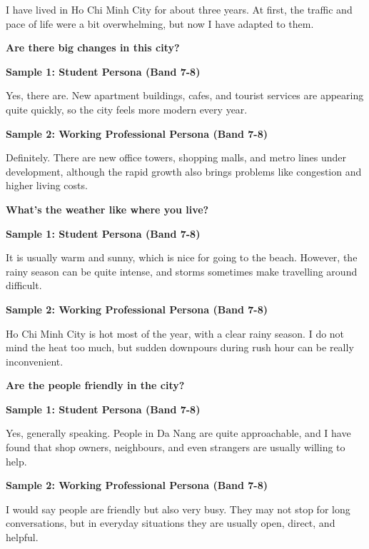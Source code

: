I have lived in Ho Chi Minh City for about three years. At first, the traffic and pace of life were a bit overwhelming, but now I have adapted to them.

\separator

\begin{ieltsquestion}
\textbf{Are there big changes in this city?}
\end{ieltsquestion}
\textbf{Sample 1: Student Persona (Band 7-8)}

Yes, there are. New apartment buildings, cafes, and tourist services are appearing quite quickly, so the city feels more modern every year.

\textbf{Sample 2: Working Professional Persona (Band 7-8)}

Definitely. There are new office towers, shopping malls, and metro lines under development, although the rapid growth also brings problems like congestion and higher living costs.

\separator

\begin{ieltsquestion}
\textbf{What's the weather like where you live?}
\end{ieltsquestion}
\textbf{Sample 1: Student Persona (Band 7-8)}

It is usually warm and sunny, which is nice for going to the beach. However, the rainy season can be quite intense, and storms sometimes make travelling around difficult.

\textbf{Sample 2: Working Professional Persona (Band 7-8)}

Ho Chi Minh City is hot most of the year, with a clear rainy season. I do not mind the heat too much, but sudden downpours during rush hour can be really inconvenient.

\separator

\begin{ieltsquestion}
\textbf{Are the people friendly in the city?}
\end{ieltsquestion}
\textbf{Sample 1: Student Persona (Band 7-8)}

Yes, generally speaking. People in Da Nang are quite approachable, and I have found that shop owners, neighbours, and even strangers are usually willing to help.

\textbf{Sample 2: Working Professional Persona (Band 7-8)}

I would say people are friendly but also very busy. They may not stop for long conversations, but in everyday situations they are usually open, direct, and helpful.

